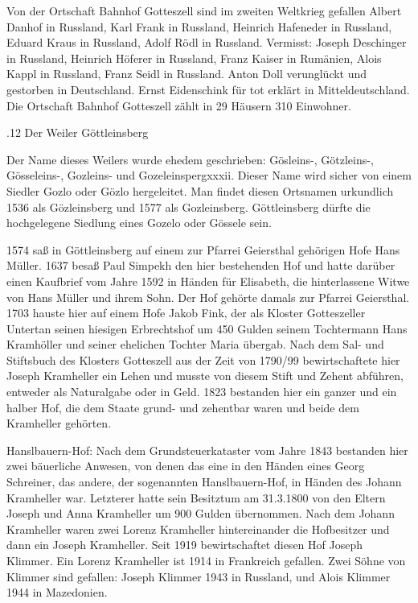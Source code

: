 \documentclass{book}
\begin{document}
Von der Ortschaft Bahnhof Gotteszell sind im zweiten Weltkrieg gefallen Albert
Danhof in Russland, Karl Frank in Russland, Heinrich Hafeneder in Russland,
Eduard Kraus in Russland, Adolf Rödl in Russland. Vermisst: Joseph Deschinger in
Russland, Heinrich Höferer in Russland, Franz Kaiser in Rumänien, Alois Kappl in
Russland, Franz Seidl in Russland. Anton Doll verunglückt und gestorben in
Deutschland. Ernst Eidenschink für tot erklärt in Mitteldeutschland. Die
Ortschaft Bahnhof Gotteszell zählt in 29 Häusern 310 Einwohner.

.12 Der Weiler Göttleinsberg

Der Name dieses Weilers wurde ehedem geschrieben: Gösleins-, Götzleins-,
Gösseleins-, Gozleins- und Gozeleinspergxxxii. Dieser Name wird sicher von einem
Siedler Gozlo oder Gözlo hergeleitet. Man findet diesen Ortsnamen urkundlich
1536 als Gözleinsberg und 1577 als Gozleinsberg. Göttleinsberg dürfte die
hochgelegene Siedlung eines Gozelo oder Gössele sein.

1574 saß in Göttleinsberg auf einem zur Pfarrei Geiersthal gehörigen Hofe Hans
Müller. 1637 besaß Paul Simpekh den hier bestehenden Hof und hatte darüber einen
Kaufbrief vom Jahre 1592 in Händen für Elisabeth, die hinterlassene Witwe von
Hans Müller und ihrem Sohn. Der Hof gehörte damals zur Pfarrei Geiersthal. 1703
hauste hier auf einem Hofe Jakob Fink, der als Kloster Gotteszeller Untertan
seinen hiesigen Erbrechtshof um 450 Gulden seinem Tochtermann Hans Kramhöller
und seiner ehelichen Tochter Maria übergab. Nach dem Sal- und Stiftsbuch des
Klosters Gotteszell aus der Zeit von 1790/99 bewirtschaftete hier Joseph
Kramheller ein Lehen und musste von diesem Stift und Zehent abführen, entweder
als Naturalgabe oder in Geld. 1823 bestanden hier ein ganzer und ein halber Hof,
die dem Staate grund- und zehentbar waren und beide dem Kramheller gehörten.

Hanslbauern-Hof: Nach dem Grundsteuerkataster vom Jahre 1843 bestanden hier zwei
bäuerliche Anwesen, von denen das eine in den Händen eines Georg Schreiner, das
andere, der sogenannten Hanslbauern-Hof, in Händen des Johann Kramheller war.
Letzterer hatte sein Besitztum am 31.3.1800 von den Eltern Joseph und Anna
Kramheller um 900 Gulden übernommen. Nach dem Johann Kramheller waren zwei
Lorenz Kramheller hintereinander die Hofbesitzer und dann ein Joseph Kramheller.
Seit 1919 bewirtschaftet diesen Hof Joseph Klimmer. Ein Lorenz Kramheller ist
1914 in Frankreich gefallen. Zwei Söhne von Klimmer sind gefallen: Joseph
Klimmer 1943 in Russland, und Alois Klimmer 1944 in Mazedonien.
\end{document}
